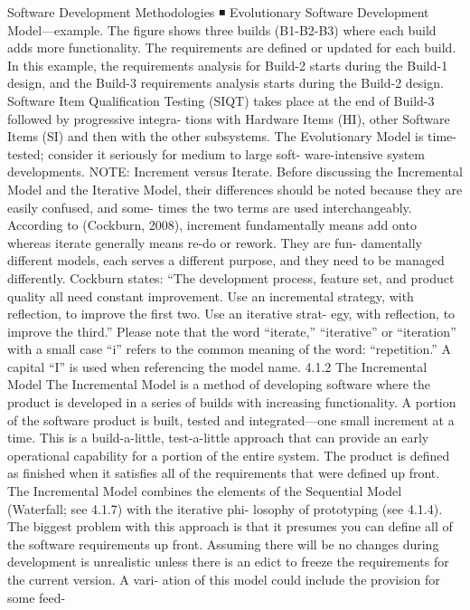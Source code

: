 \documentclass[a4paper,12pt]{book}
\begin{document}
Software Development Methodologies ◾
Evolutionary Software Development Model—example.
The figure shows three builds (B1-B2-B3) where each
build adds more functionality. The requirements are defined
or updated for each build. In this example, the requirements
analysis for Build-2 starts during the Build-1 design, and
the Build-3 requirements analysis starts during the Build-2
design. Software Item Qualification Testing (SIQT) takes
place at the end of Build-3 followed by progressive integra-
tions with Hardware Items (HI), other Software Items (SI)
and then with the other subsystems. The Evolutionary Model
is time-tested; consider it seriously for medium to large soft-
ware-intensive system developments.
NOTE: Increment versus Iterate. Before discussing the
Incremental Model and the Iterative Model, their differences
should be noted because they are easily confused, and some-
times the two terms are used interchangeably. According to
(Cockburn, 2008), increment fundamentally means add onto
whereas iterate generally means re-do or rework. They are fun-
damentally different models, each serves a different purpose,
and they need to be managed differently. Cockburn states:
“The development process, feature set, and product quality
all need constant improvement. Use an incremental strategy,
with reflection, to improve the first two. Use an iterative strat-
egy, with reflection, to improve the third.” Please note that
the word “iterate,” “iterative” or “iteration” with a small case
“i” refers to the common meaning of the word: “repetition.” A
capital “I” is used when referencing the model name.
4.1.2 The Incremental Model
The Incremental Model is a method of developing software
where the product is developed in a series of builds with
increasing functionality. A portion of the software product is
built, tested and integrated—one small increment at a time.
This is a build-a-little, test-a-little approach that can provide
an early operational capability for a portion of the entire
system. The product is defined as finished when it satisfies all
of the requirements that were defined up front.
The Incremental Model combines the elements of the
Sequential Model (Waterfall; see 4.1.7) with the iterative phi-
losophy of prototyping (see 4.1.4). The biggest problem with
this approach is that it presumes you can define all of the
software requirements up front. Assuming there will be no
changes during development is unrealistic unless there is an
edict to freeze the requirements for the current version. A vari-
ation of this model could include the provision for some feed-
\end{document}
